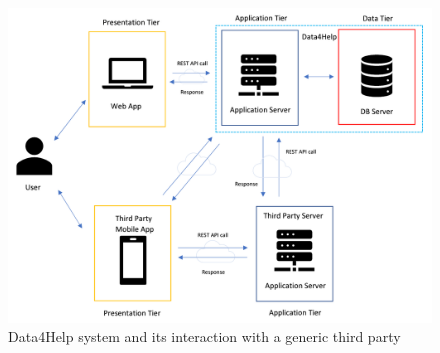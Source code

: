 \documentclass[a4paper]{article}
\begin{document}
\vspace{1cm}
\begin{figure}[H]
    \centering
    \includegraphics[width=\linewidth]{architecturalDesign-data4help}
    \caption{Data4Help system and its interaction with a generic third party}
    \label{fig:my_label}
\end{figure}
\end{document}
